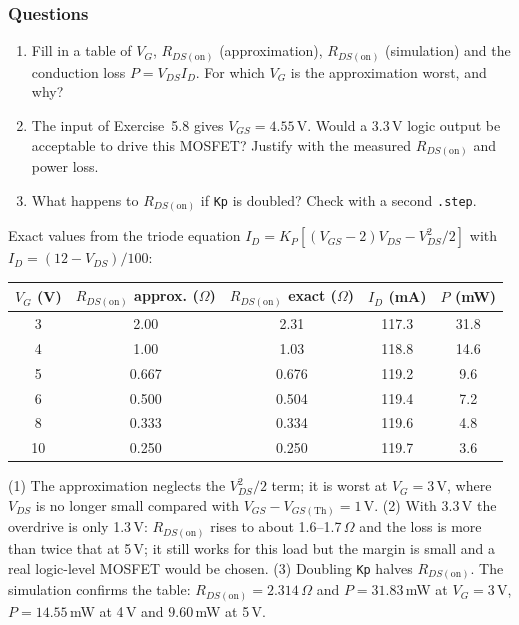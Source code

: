 \subsubsection*{Questions}
\begin{enumerate}[itemsep=2pt]
  \item Fill in a table of $V_G$, $R_{DS(\mathrm{on})}$ (approximation), $R_{DS(\mathrm{on})}$ (simulation) and the conduction
        loss $P = V_{DS} I_D$. For which $V_G$ is the approximation worst, and why?
  \item The input of Exercise~5.8 gives $V_{GS} = 4.55$\,V. Would a 3.3\,V logic output be acceptable to drive this MOSFET? Justify with
        the measured $R_{DS(\mathrm{on})}$ and power loss.
  \item What happens to $R_{DS(\mathrm{on})}$ if \texttt{Kp} is doubled? Check with a second \texttt{.step}.
\end{enumerate}
\begin{solution}
Exact values from the triode equation $I_D = K_P[(V_{GS}-2)V_{DS} - V_{DS}^2/2]$ with $I_D = (12-V_{DS})/100$:
\begin{center}
\begin{tabular}{c c c c c}
\toprule
$V_G$ (V) & $R_{DS(\mathrm{on})}$ approx. ($\Omega$) & $R_{DS(\mathrm{on})}$ exact ($\Omega$) & $I_D$ (mA) & $P$ (mW)\\ \midrule
3 & 2.00 & 2.31 & 117.3 & 31.8\\
4 & 1.00 & 1.03 & 118.8 & 14.6\\
5 & 0.667 & 0.676 & 119.2 & 9.6\\
6 & 0.500 & 0.504 & 119.4 & 7.2\\
8 & 0.333 & 0.334 & 119.6 & 4.8\\
10 & 0.250 & 0.250 & 119.7 & 3.6\\
\bottomrule
\end{tabular}
\end{center}
(1) The approximation neglects the $V_{DS}^2/2$ term; it is worst at $V_G = 3$\,V, where $V_{DS}$ is no longer small compared
with $V_{GS}-V_{GS(\mathrm{Th})} = 1$\,V. (2) With 3.3\,V the overdrive is only 1.3\,V: $R_{DS(\mathrm{on})}$ rises to
about 1.6--1.7\,$\Omega$ and the loss is more than twice that at 5\,V; it still works for this load but the margin is small and a
real logic-level MOSFET would be chosen. (3) Doubling \texttt{Kp} halves $R_{DS(\mathrm{on})}$.
The simulation confirms the table: $R_{DS(\mathrm{on})}=2.314\,\Omega$ and $P=31.83$\,mW at $V_G=3$\,V, $P=14.55$\,mW at 4\,V and $9.60$\,mW at 5\,V.
\end{solution}
